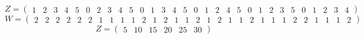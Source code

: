 \documentclass{article}
\begin{document}
$$
 Z =\left(
\begin{array}{cccccccccccccccccccccccccccccc}
1 \!&\! 2 \!&\! 3 \!&\! 4 \!&\! 5 \!&\! 0 \!&\! 2 \!&\! 3 \!&\! 4 \!&\! 5 \!&\! 0 \!&\! 1 \!&\! 3 \!&\! 4 \!&\! 5 \!&\! 0 \!&\! 1 \!&\! 2 \!&\! 4 \!&\! 5 \!&\! 0 \!&\! 1 \!&\! 2 \!&\! 3 \!&\! 5 \!&\! 0 \!&\! 1 \!&\! 2 \!&\! 3 \!&\! 4 
\end{array}
\right)$$
$$
 W =\left(
\begin{array}{cccccccccccccccccccccccccccccc}
2 \!&\! 2 \!&\! 2 \!&\! 2 \!&\! 2 \!&\! 2 \!&\! 1 \!&\! 1 \!&\! 1 \!&\! 1 \!&\! 2 \!&\! 1 \!&\! 2 \!&\! 1 \!&\! 1 \!&\! 2 \!&\! 1 \!&\! 2 \!&\! 1 \!&\! 1 \!&\! 2 \!&\! 1 \!&\! 1 \!&\! 1 \!&\! 2 \!&\! 2 \!&\! 1 \!&\! 1 \!&\! 1 \!&\! 2 
\end{array}
\right)$$
$$
 Z =\left(
\begin{array}{cccccc}
5 \!&\! 10 \!&\! 15 \!&\! 20 \!&\! 25 \!&\! 30 
\end{array}
\right)$$
\end{document}
